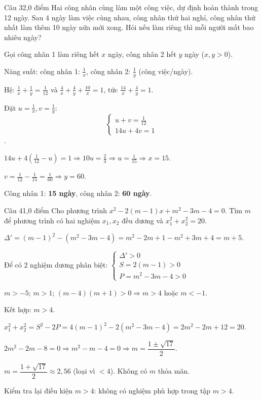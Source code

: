 \begin{de_cau}{Câu 3}{2,0 điểm}
Hai công nhân cùng làm một công việc, dự định hoàn thành trong 12 ngày. Sau 4 ngày làm việc cùng
nhau, công nhân thứ hai nghỉ, công nhân thứ nhất làm thêm 10 ngày nữa mới xong. Hỏi nếu làm riêng
thì mỗi người mất bao nhiêu ngày?
\end{de_cau}

\begin{loi_giai_cau}
Gọi công nhân 1 làm riêng hết $x$ ngày, công nhân 2 hết $y$ ngày ($x,y>0$).

Năng suất: công nhân 1: $\frac{1}{x}$, công nhân 2: $\frac{1}{y}$ (công việc/ngày).

Hệ:
$\frac{1}{x}+\frac{1}{y}=\frac{1}{12}$ và $\frac{4}{x}+\frac{4}{y}+\frac{10}{x}=1$, tức $\frac{14}{x}+\frac{4}{y}=1$.

Đặt $u=\frac{1}{x}, v=\frac{1}{y}$:
\[ \begin{cases}u+v=\frac{1}{12}\\14u+4v=1\end{cases} \].

$14u+4(\frac{1}{12}-u)=1\Rightarrow 10u=\frac{2}{3}\Rightarrow u=\frac{1}{15}\Rightarrow x=15$.

$v=\frac{1}{12}-\frac{1}{15}=\frac{1}{60}\Rightarrow y=60$.

Công nhân 1: \textbf{15 ngày}, công nhân 2: \textbf{60 ngày}.
\end{loi_giai_cau}

\begin{de_cau}{Câu 4}{1,0 điểm}
Cho phương trình $x^2-2(m-1)x+m^2-3m-4=0$. Tìm $m$ để phương trình có hai nghiệm $x_1, x_2$
đều dương và $x_1^2+x_2^2=20$.
\end{de_cau}

\begin{loi_giai_cau}
$\Delta'=(m-1)^2-(m^2-3m-4)=m^2-2m+1-m^2+3m+4=m+5$.

Để có 2 nghiệm dương phân biệt:
$\begin{cases}\Delta'>0\\S=2(m-1)>0\\P=m^2-3m-4>0\end{cases}$

$m>-5$; $m>1$; $(m-4)(m+1)>0\Rightarrow m>4$ hoặc $m<-1$.

Kết hợp: $m>4$.

$x_1^2+x_2^2=S^2-2P=4(m-1)^2-2(m^2-3m-4)=2m^2-2m+12=20$.

$2m^2-2m-8=0\Rightarrow m^2-m-4=0\Rightarrow m=\dfrac{1\pm\sqrt{17}}{2}$.

$m=\dfrac{1+\sqrt{17}}{2}\approx 2{,}56$ (loại vì $<4$). Không có $m$ thỏa mãn.

Kiểm tra lại điều kiện $m>4$: không có nghiệm phù hợp trong tập $m>4$.
\end{loi_giai_cau}
